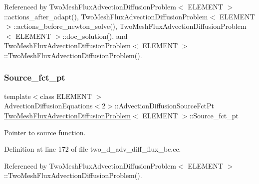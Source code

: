 Referenced by Two\+Mesh\+Flux\+Advection\+Diffusion\+Problem$<$ E\+L\+E\+M\+E\+N\+T $>$\+::actions\+\_\+after\+\_\+adapt(), Two\+Mesh\+Flux\+Advection\+Diffusion\+Problem$<$ E\+L\+E\+M\+E\+N\+T $>$\+::actions\+\_\+before\+\_\+newton\+\_\+solve(), Two\+Mesh\+Flux\+Advection\+Diffusion\+Problem$<$ E\+L\+E\+M\+E\+N\+T $>$\+::doc\+\_\+solution(), and Two\+Mesh\+Flux\+Advection\+Diffusion\+Problem$<$ E\+L\+E\+M\+E\+N\+T $>$\+::\+Two\+Mesh\+Flux\+Advection\+Diffusion\+Problem().

\mbox{\label{classTwoMeshFluxAdvectionDiffusionProblem_a73a3fdaa5eb9cfffc19ed0cd8fd8379c}} 
\subsubsection{\texorpdfstring{Source\+\_\+fct\+\_\+pt}{Source\_fct\_pt}}
{\footnotesize\ttfamily template$<$class E\+L\+E\+M\+E\+NT $>$ \\
Advection\+Diffusion\+Equations$<$2$>$\+::Advection\+Diffusion\+Source\+Fct\+Pt \hyperlink{classTwoMeshFluxAdvectionDiffusionProblem}{Two\+Mesh\+Flux\+Advection\+Diffusion\+Problem}$<$ E\+L\+E\+M\+E\+NT $>$\+::Source\+\_\+fct\+\_\+pt\hspace{0.3cm}{\ttfamily [private]}}



Pointer to source function. 



Definition at line 172 of file two\+\_\+d\+\_\+adv\+\_\+diff\+\_\+flux\+\_\+bc.\+cc.



Referenced by Two\+Mesh\+Flux\+Advection\+Diffusion\+Problem$<$ E\+L\+E\+M\+E\+N\+T $>$\+::\+Two\+Mesh\+Flux\+Advection\+Diffusion\+Problem().

\mbox{\label{classTwoMeshFluxAdvectionDiffusionProblem_a0b1a0dd20caad23315b6837bb773327e}} 
